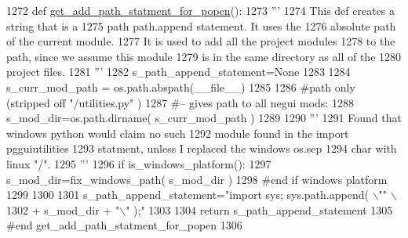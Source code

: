 \begin{DoxyCode}
1272 \textcolor{keyword}{def }\hyperlink{namespacenegui_1_1pgutilities_a606a7615fe2e94332376016ce8abe372}{get\_add\_path\_statment\_for\_popen}():
1273     \textcolor{stringliteral}{'''}
1274 \textcolor{stringliteral}{    This def creates a string that is a}
1275 \textcolor{stringliteral}{    path path.append statement.  It uses the }
1276 \textcolor{stringliteral}{    absolute path of the current module.}
1277 \textcolor{stringliteral}{    It is used to add all the project modules}
1278 \textcolor{stringliteral}{    to the path, since we assume this module}
1279 \textcolor{stringliteral}{    is in the same directory as all of the }
1280 \textcolor{stringliteral}{    project files.}
1281 \textcolor{stringliteral}{    '''}
1282     s\_path\_append\_statement=\textcolor{keywordtype}{None}
1283 
1284     s\_curr\_mod\_path = os.path.abspath(\_\_file\_\_)
1285 
1286     \textcolor{comment}{#path only (stripped off "/utilities.py" )}
1287     \textcolor{comment}{#-- gives path to all negui mods:}
1288     s\_mod\_dir=os.path.dirname( s\_curr\_mod\_path )
1289 
1290     \textcolor{stringliteral}{'''}
1291 \textcolor{stringliteral}{    Found that windows python would claim no such}
1292 \textcolor{stringliteral}{    module found in the import pgguiutilities }
1293 \textcolor{stringliteral}{    statment, unless I replaced the windows os.sep}
1294 \textcolor{stringliteral}{    char with linux "/".}
1295 \textcolor{stringliteral}{    '''}
1296     \textcolor{keywordflow}{if} is\_windows\_platform():
1297         s\_mod\_dir=fix\_windows\_path( s\_mod\_dir )
1298     \textcolor{comment}{#end if windows platform}
1299 
1300 
1301     s\_path\_append\_statement=\textcolor{stringliteral}{"import sys; sys.path.append( \(\backslash\)""} \(\backslash\)
1302                     + s\_mod\_dir + \textcolor{stringliteral}{"\(\backslash\)" );"}
1303 
1304     \textcolor{keywordflow}{return} s\_path\_append\_statement
1305 \textcolor{comment}{#end get\_add\_path\_statment\_for\_popen}
1306 
\end{DoxyCode}

